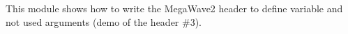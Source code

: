 This module shows how to write the MegaWave2 header to define variable
and not used arguments (demo of the header \#3).

